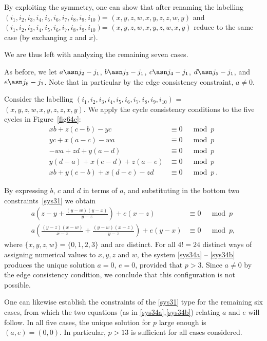 By exploiting the symmetry, one can show that after renaming the
labelling $(i_1,i_2,i_3,i_4,i_5,i_6,i_7,i_8,i_9,i_{10})$=
$(x,y,z,w,x,y,z,z,w,y)$ and
$(i_1,i_2,i_3,i_4,i_5,i_6,i_7,i_8,i_9,i_{10})$=
$(x,y,z,w,x,y,z,w,x,y)$ reduce to the same case (by exchanging $z$
and $x$). %

We are thus left with analyzing the remaining seven cases.

As before, we let $a \asn j_2-j_1$, $b \asn j_3-j_1$, $c \asn
j_4-j_1$,
 $d \asn j_5-j_1$, and $e \asn j_6-j_1$.  Note that in particular
 by the edge consistency constraint, $a \neq 0$.

Consider the labelling
$(i_1,i_2,i_3,i_4,i_5,i_6,i_7,i_8,i_9,i_{10})$ =
$(x,y,z,w,x,y,z,z,x,y)$. We apply the cycle consistency conditions
to the five cycles in Figure~\ref{fig64c}:
 \begin{equation}\label{sys31}\begin{array}{cccc}
 xb+z(c-b)-yc &\equiv 0 &\mod p\\
 yc+x(a-c)-wa &\equiv 0 &\mod p\\
 -wa+zd+y(a-d) &\equiv 0 &\mod p\\
 y(d-a)+x(e-d)+z(a-e) &\equiv 0 &\mod p\\
 xb+y(e-b)+x(d-e)-zd &\equiv 0 &\mod p~.
 \end{array}\end{equation}



By expressing $b$, $c$ and $d$ in terms of $a$, and substituting
in the bottom two constraints~\eqref{sys31} we obtain
\begin{eqnarray}\label{sys34a}
a\left(z-y+\frac{(y-w)(y-x)}{y-z}\right)+e(x-z) &\equiv 0 &\mod
p\\
\label{sys34b}a\left(\frac{(y-z)(x-w)}{x-z}+\frac{(y-w)(x-z)}{y-z}\right)+e(y-x)&\equiv
0 &\mod p,
\end{eqnarray}
where $\{x,y,z,w\} =\{0,1,2,3\}$ and are distinct. For all $4!=24$
distinct ways of assigning numerical values to $x,y,z$ and $w$, the
system \eqref{sys34a} -- \eqref{sys34b} produces the unique solution
$a=0$, $e=0$, provided that $p>3$. Since $a\neq 0$ by the edge
consistency condition, we conclude that this configuration is not
possible.

One can likewise establish the constraints of the \eqref{sys31}
type for the remaining six cases, from which the two equations (as
in \eqref{sys34a},\eqref{sys34b}) relating $a$ and $e$ will
follow. In all five cases, the unique solution for $p$ large
enough is $(a,e)=(0,0)$. In particular, $p>13$ is sufficient for
all cases considered.


